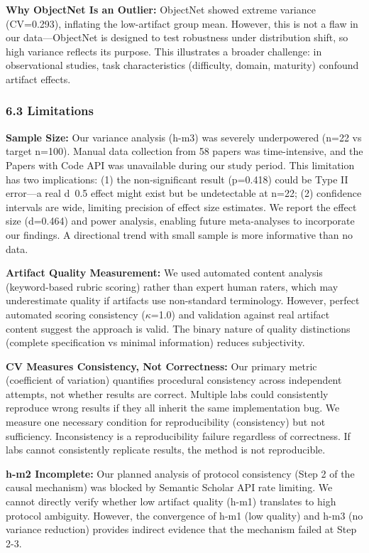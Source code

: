 \textbf{Why ObjectNet Is an Outlier:} ObjectNet showed extreme variance (CV=0.293), inflating the low-artifact group mean. However, this is not a flaw in our data---ObjectNet is designed to test robustness under distribution shift, so high variance reflects its purpose. This illustrates a broader challenge: in observational studies, task characteristics (difficulty, domain, maturity) confound artifact effects.

\subsubsection{6.3 Limitations}

\textbf{Sample Size:} Our variance analysis (h-m3) was severely underpowered (n=22 vs target n=100). Manual data collection from 58 papers was time-intensive, and the Papers with Code API was unavailable during our study period. This limitation has two implications: (1) the non-significant result (p=0.418) could be Type II error---a real d~0.5 effect might exist but be undetectable at n=22; (2) confidence intervals are wide, limiting precision of effect size estimates. We report the effect size (d=0.464) and power analysis, enabling future meta-analyses to incorporate our findings. A directional trend with small sample is more informative than no data.

\textbf{Artifact Quality Measurement:} We used automated content analysis (keyword-based rubric scoring) rather than expert human raters, which may underestimate quality if artifacts use non-standard terminology. However, perfect automated scoring consistency ($\kappa$=1.0) and validation against real artifact content suggest the approach is valid. The binary nature of quality distinctions (complete specification vs minimal information) reduces subjectivity.

\textbf{CV Measures Consistency, Not Correctness:} Our primary metric (coefficient of variation) quantifies procedural consistency across independent attempts, not whether results are correct. Multiple labs could consistently reproduce wrong results if they all inherit the same implementation bug. We measure one necessary condition for reproducibility (consistency) but not sufficiency. Inconsistency is a reproducibility failure regardless of correctness. If labs cannot consistently replicate results, the method is not reproducible.

\textbf{h-m2 Incomplete:} Our planned analysis of protocol consistency (Step 2 of the causal mechanism) was blocked by Semantic Scholar API rate limiting. We cannot directly verify whether low artifact quality (h-m1) translates to high protocol ambiguity. However, the convergence of h-m1 (low quality) and h-m3 (no variance reduction) provides indirect evidence that the mechanism failed at Step 2-3.

